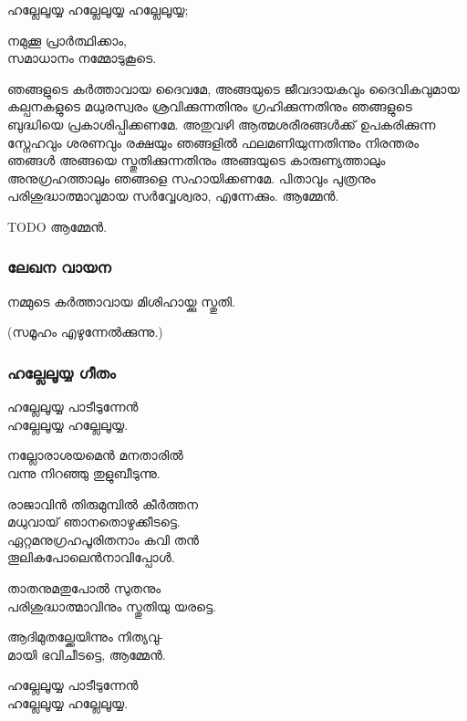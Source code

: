 \documentclass[20pt]{beamer}
\newcommand{\Priest}[1]{\color{white}#1}
\newcommand{\People}[1]{\color{yellow}#1}
\newcommand{\Server}[1]{\color{lightgray}#1}
\newcommand{\Notice}[1]{\color{lime}(#1)}
\newcommand{\SignOfCross}{പിതാവും പുത്രനും പരിശുദ്ധാത്മാവുമായ സര്‍വ്വേശ്വരാ, എന്നേക്കും.}
\newcommand{\Ammen}{\People{ആമ്മേന്‍.}}
\newcommand{\LetsPray}{\Server{നമുക്കൂ പ്രാര്‍ത്ഥിക്കാം,\\ സമാധാനം നമ്മോടുകൂടെ.}}
\begin{document}
\begin{frame}
\Server{ഹല്ലേലൂയ്യ ഹല്ലേലൂയ്യ ഹല്ലേലൂയ്യ;}\par
\LetsPray
\end{frame}

\begin{frame}[allowframebreaks]
\Priest{
 ഞങ്ങളുടെ കര്‍ത്താവായ ദൈവമേ, അങ്ങയുടെ
 ജീവദായകവും ദൈവികവുമായ കല്പനകളുടെ മധുരസ്വരം
 ശ്രവിക്കുന്നതിനും ഗ്രഹിക്കുന്നതിനും ഞങ്ങളുടെ ബുദ്ധിയെ
 പ്രകാശിപ്പിക്കണമേ. അതുവഴി ആത്മശരീരങ്ങള്‍ക്ക്
ഉപകരിക്കുന്ന സ്നേഹവും ശരണവും രക്ഷയും ഞങ്ങളില്‍
ഫലമണിയുന്നതിന്നും നിരന്തരം ഞങ്ങള്‍ അങ്ങയെ
സ്തുതിക്കുന്നതിനും അങ്ങയുടെ കാരുണ്യത്താലും
അനുഗ്രഹത്താലും ഞങ്ങളെ സഹായിക്കണമേ.
\SignOfCross} \Ammen
\end{frame}

\begin{frame}[allowframebreaks]
\Priest{
TODO
} \Ammen
\end{frame}

\begin{frame}
\frametitle{ലേഖന വായന}
\People{നമ്മുടെ കര്‍ത്താവായ മിശിഹായ്ക്കു സ്തുതി.}\par
\Notice{സമൂഹം എഴുന്നേല്‍ക്കുന്നു.}
\end{frame}

\begin{frame}[allowframebreaks]
\frametitle{ഹല്ലേലൂയ്യ ഗീതം}
\People{
ഹല്ലേലൂയ്യ പാടീടുന്നേന്‍\\
ഹല്ലേലൂയ്യ ഹല്ലേലൂയ്യ.\par
നല്ലോരാശയമെന്‍ മനതാരില്‍\\
വന്നു നിറഞ്ഞു തുളുബീടുന്നു.\par
രാജാവിന്‍ തിരുമുമ്പില്‍ കീര്‍ത്തന\\
മധുവായ് ഞാനതൊഴുക്കീടട്ടെ.\\
\framebreak
ഏറ്റമനുഗ്രഹപൂരിതനാം കവി തന്‍ \\
തൂലികപോലെന്‍നാവിപ്പോള്‍.\par
താതനുമതുപോല്‍ സുതനും\\
പരിശുദ്ധാത്മാവിനും സ്തുതിയു യരട്ടെ.\par
ആദിമുതല്ക്കേയിന്നും നിത്യവു-\\
മായി ഭവിചീടട്ടെ, ആമ്മേന്‍.\par
ഹല്ലേലൂയ്യ പാടീടുന്നേന്‍\\
ഹല്ലേലൂയ്യ ഹല്ലേലൂയ്യ.}
\end{frame}

\iffalse
\begin{frame}[allowframebreaks]
\frametitle{സുവിശേഷവായനയ്ക്ക് ഒരുക്കം}
\Priest{
ലോകത്തിന്‍റെ പ്രകാശവും സകലത്തിന്‍റെയും ജീവനുമായ 
മിശിഹായെ, നിന്നെ ഞങ്ങളുടെ പക്കലേക്കയച്ച 
അനന്തകാരുണ്യത്തിന് എന്നേക്കും സ്തുതി. ആമ്മേന്‍.}
\end{frame}
\fi
\end{document}
